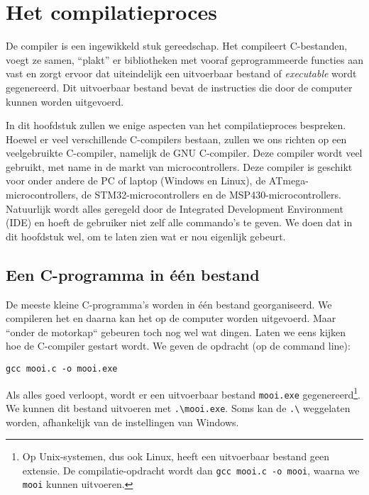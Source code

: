 \chapter{Het compilatieproces}
\label{cha:compilatieproces}
\thispagestyle{empty}

De compiler is een ingewikkeld stuk gereedschap. Het compileert C-bestanden, voegt ze samen, ``plakt'' er bibliotheken met vooraf geprogrammeerde functies aan vast en zorgt ervoor dat uiteindelijk een uitvoerbaar bestand of \textsl{executable} wordt gegenereerd. Dit uitvoerbaar bestand bevat de instructies die door de computer kunnen worden uitgevoerd.

In dit hoofdstuk zullen we enige aspecten van het compilatieproces bespreken. Hoewel er veel verschillende C-compilers bestaan, zullen we ons richten op een veelgebruikte C-compiler, namelijk de GNU C-compiler. Deze compiler wordt veel gebruikt, met name in de markt van microcontrollers. Deze compiler is geschikt voor onder andere de PC of laptop (Windows en Linux), de ATmega-microcontrollers, de STM32-microcontrollers en de MSP430-microcontrollers. Natuurlijk wordt alles geregeld door de Integrated Development Environment (IDE) en hoeft de gebruiker niet zelf alle commando's te geven. We doen dat in dit hoofdstuk wel, om te laten zien wat er nou eigenlijk gebeurt.


\section{Een C-programma in één bestand}
De meeste kleine C-programma's worden in één bestand georganiseerd. We compileren het en daarna kan het op de computer worden uitgevoerd. Maar ``onder de motorkap`` gebeuren toch nog wel wat dingen. Laten we eens kijken hoe de C-compiler gestart wordt. We geven de opdracht (op de command line):

\hspace*{1em}\texttt{gcc mooi.c -o mooi.exe}

Als alles goed verloopt, wordt er een uitvoerbaar bestand \texttt{mooi.exe} gegenereerd\footnote{Op Unix-systemen, dus ook Linux, heeft een uitvoerbaar bestand geen extensie. De compilatie-opdracht wordt dan \texttt{gcc mooi.c -o mooi}, waarna we \texttt{mooi} kunnen uitvoeren.}. We kunnen dit bestand uitvoeren met \texttt{.\textbackslash mooi.exe}. Soms kan de \texttt{.\textbackslash} weggelaten worden, afhankelijk van de instellingen van Windows.


